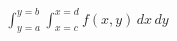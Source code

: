 \documentclass[preview]{standalone}
\begin{document}
\begin{align*}
\int_{y=a}^{y=b} \int_{x=c}^{x=d} f(x,y)\,dx\,dy
\end{align*}
\end{document}
